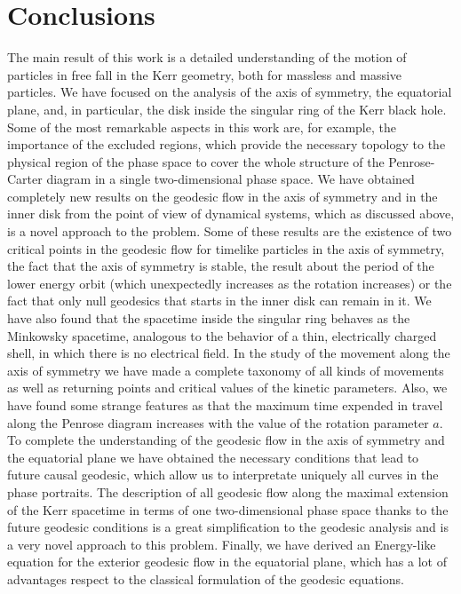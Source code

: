 \chapter{Conclusions}\label{ch:Concl}

The main result of this work is a detailed understanding of the motion
of particles in free fall in the Kerr geometry, both for massless and massive
particles. We have focused on the analysis of the axis of symmetry, the equatorial plane, and, in particular, the disk inside the singular ring of the Kerr black hole. Some of the most remarkable aspects in this work are, for example, the importance of the excluded regions, which provide the necessary topology to the physical region of the phase space to cover the whole structure of the
Penrose-Carter diagram in a single two-dimensional phase space. We have obtained completely new results on the geodesic flow in the axis of symmetry and in the inner disk from the point of view of dynamical systems, which as discussed above, is a novel approach to the problem. Some of these results are the existence of two critical points in the geodesic flow for timelike particles in the axis of symmetry, the fact that the axis of symmetry is stable, the result about the period of the lower energy orbit (which unexpectedly increases as the rotation increases) or the fact that only null geodesics that starts in the inner disk can remain in it. We have also found that the spacetime inside the singular ring behaves as the Minkowsky spacetime, analogous to the behavior of a thin, electrically charged shell, in which there is no electrical field. In the study of the movement along the axis of symmetry we have made a complete taxonomy of all kinds of movements as well as returning points and critical values of the kinetic parameters. Also, we have found some strange features as that the maximum time expended in travel along the Penrose diagram increases with the value of the rotation parameter $a$. To complete the understanding of the geodesic flow in the axis of symmetry and the equatorial plane we have obtained the necessary conditions that lead to future causal geodesic, which allow us to interpretate uniquely all curves in the phase portraits. The description of all geodesic flow along the maximal extension of the Kerr spacetime in terms of one two-dimensional phase space thanks to the future geodesic conditions is a great simplification to the geodesic analysis and is a very novel approach to this problem. Finally, we have derived an Energy-like equation for the exterior geodesic flow in the equatorial plane, which has a lot of advantages respect to the classical formulation of the geodesic equations.